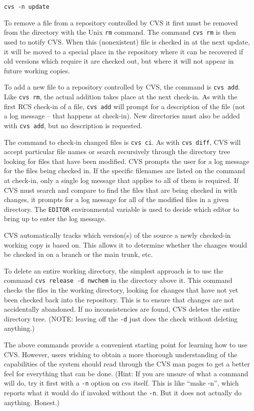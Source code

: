 \begin{verbatim}
cvs -n update
\end{verbatim}

To remove a file from a repository controlled by CVS
it first must be removed from the directory with the Unix {\tt rm} command.  The
command {\tt cvs rm} is then used to notify CVS\@.  When this (nonexistent) file
is checked in at the next update,
it will be moved to a special place in the repository where
it can be recovered if old versions which require it are checked out,
but where it will not appear in future working copies.

To add a new file to a repository controlled by CVS, 
the command is {\tt cvs add}.  Like {\tt cvs
rm}, the actual addition takes place at the next check-in.  As with
the first RCS check-in of a file, {\tt cvs add} will prompt for a
description of the file (not a log message -- that happens at
check-in).  New directories must also be added with {\tt cvs add}, but no
description is requested.

The command to check-in changed files is {\tt cvs ci}.  As with {\tt cvs diff},
CVS will accept particular file names or search recursively through the directory
tree looking for files that have been modified.  CVS prompts the user for a
log message for the files being checked in.  If the specific filenames are listed on
the command at
check-in, only a single log message that applies to all of them is required.  
If CVS must search and compare to find the files that are being checked in with
changes, it prompts for a log message for
all of the modified files in a given directory.  The {\tt EDITOR}
environmental variable is used to decide which editor to bring up to
enter the log message.

CVS automatically tracks which version(s) of the source a newly checked-in working
copy is based on. This allows it to determine whether the changes would be
checked in on a branch or the main trunk, etc.

To delete an entire working directory, the simplest approach is to use the command
{\tt cvs release -d nwchem} in the directory above it.  This command
checks the files in the working directory, looking for changes that have not
yet been checked back into the repository.  This is to ensure that changes
are not accidentally abandoned.  If no inconsistencies are found, CVS
deletes the entire
directory tree.   (NOTE: leaving off the {\tt -d} just does the check without
deleting anything.)

The above commands provide a convenient starting point for learning how to use CVS.
However, users wishing to obtain a more thorough understanding of the capabilities
of the system should read through the CVS man pages to get a better feel 
for everything that can
be done.  (Hint: If you are unsure of what a command will do, try it first
with a {\tt -n} option on cvs itself.  This is like ``make -n'', which
reports what it would do if invoked without the {\tt -n}.  But it does not actually
do anything.  Honest.)

